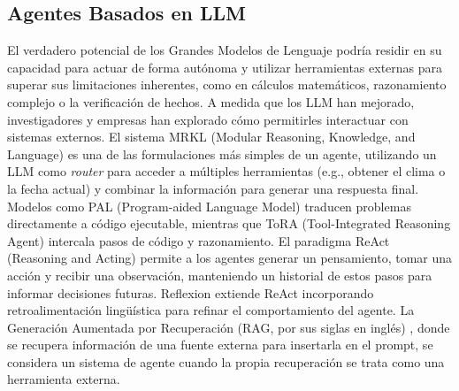\subsection{Agentes Basados en LLM}
\label{subsec:agentes_llm}
El verdadero potencial de los Grandes Modelos de Lenguaje podría residir en su capacidad para actuar de forma autónoma y utilizar herramientas externas para superar sus limitaciones inherentes, como en cálculos matemáticos, razonamiento complejo o la verificación de hechos. A medida que los LLM han mejorado, investigadores y empresas han explorado cómo permitirles interactuar con sistemas externos.
El sistema MRKL (Modular Reasoning, Knowledge, and Language) \citep{karpasMRKLSystemsModular2022} es una de las formulaciones más simples de un agente, utilizando un LLM como \textit{router} para acceder a múltiples herramientas (e.g., obtener el clima o la fecha actual) y combinar la información para generar una respuesta final. Modelos como PAL (Program-aided Language Model) \citep{gaoPALProgramaidedLanguage2023} traducen problemas directamente a código ejecutable, mientras que ToRA (Tool-Integrated Reasoning Agent) \citep{gouToRAToolIntegratedReasoning2024} intercala pasos de código y razonamiento. El paradigma ReAct (Reasoning and Acting) \citep{yaoReActSynergizingReasoning2023} permite a los agentes generar un pensamiento, tomar una acción y recibir una observación, manteniendo un historial de estos pasos para informar decisiones futuras. Reflexion \citep{shinnReflexionLanguageAgents2023} extiende ReAct incorporando retroalimentación lingüística para refinar el comportamiento del agente. La Generación Aumentada por Recuperación (RAG, por sus siglas en inglés) \citep{lewisRetrievalAugmentedGenerationKnowledgeIntensive2021}, donde se recupera información de una fuente externa para insertarla en el prompt, se considera un sistema de agente cuando la propia recuperación se trata como una herramienta externa.

